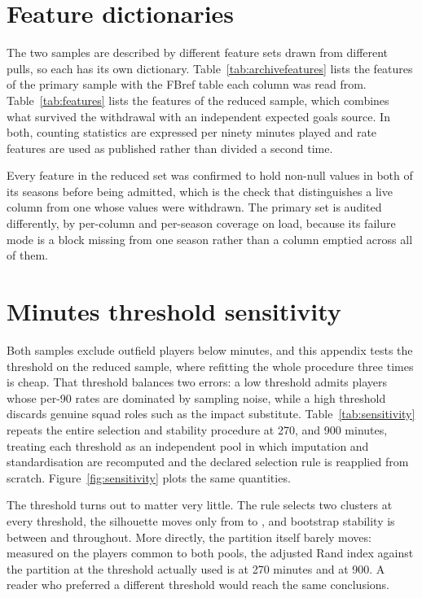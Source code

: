 \section{Feature dictionaries}
\label{sec:appendix:features}

The two samples are described by different feature sets drawn from different pulls, so each
has its own dictionary. Table~\ref{tab:archivefeatures} lists the \ArcFeatures{} features
of the primary sample with the FBref table each column was read from.
Table~\ref{tab:features} lists the \NFeatures{} features of the reduced sample, which
combines what survived the withdrawal with an independent expected goals source. In both,
counting statistics are expressed per ninety minutes played and rate features are used as
published rather than divided a second time.

Every feature in the reduced set was confirmed to hold non-null values in both of its
seasons before being admitted, which is the check that distinguishes a live column from one
whose values were withdrawn. The primary set is audited differently, by per-column and
per-season coverage on load, because its failure mode is a block missing from one season
rather than a column emptied across all of them.





\section{Minutes threshold sensitivity}
\label{sec:appendix:sensitivity}

Both samples exclude outfield players below \MinMinutes{} minutes, and this appendix tests
the threshold on the reduced sample, where refitting the whole procedure three times is
cheap. That threshold balances two errors: a low threshold admits players whose per-90 rates are dominated by
sampling noise, while a high threshold discards genuine squad roles such as the impact
substitute. Table~\ref{tab:sensitivity} repeats the entire selection and stability procedure at 270,
\MinMinutes{} and 900 minutes, treating each threshold as an independent pool in which
imputation and standardisation are recomputed and the declared selection rule is reapplied
from scratch. Figure~\ref{fig:sensitivity} plots the same quantities.

The threshold turns out to matter very little. The rule selects two clusters at every
threshold, the silhouette moves only from \SensSilhouetteLow{} to
\SensSilhouetteHigh{}, and bootstrap stability is between \SensARILow{} and
\SensARIHigh{} throughout. More directly, the partition itself barely moves: measured on
the players common to both pools, the adjusted Rand index against the partition at the
threshold actually used is \SensAgreeLow{} at 270 minutes and \SensAgreeHigh{} at 900. A
reader who preferred a different threshold would reach the same conclusions.

